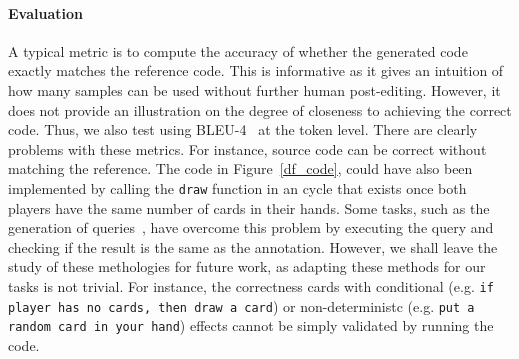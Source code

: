 \documentclass[11pt]{article}
\begin{document}
\paragraph{Evaluation} A typical metric is to compute the accuracy of whether
the generated code exactly matches the reference code. This is informative as
it gives an intuition of how many samples can be used without further
human post-editing. However, it does not provide an illustration on the degree
of closeness to achieving the correct code. Thus, we also test using
BLEU-4~\cite{Papineni:2002:BMA:1073083.1073135} at the token level. There are clearly problems with these metrics. For instance, source code can be correct without matching the reference. The code in Figure~\ref{df_code}, could have also been implemented by calling the \texttt{draw} function in an cycle that exists once both players have the same number of cards in their hands. Some tasks, such as the generation of queries~\cite{zelle:aaai96}, have overcome this problem by executing the query and checking if the result is the same as the annotation. However, we shall leave the study of these methologies for future work, as adapting these methods for our tasks is not trivial. For instance, the correctness cards with conditional (e.g. \texttt{if player has no cards, then draw a card}) or non-deterministc (e.g. \texttt{put a random card in your hand}) effects cannot be simply validated by running the code.
\end{document}
